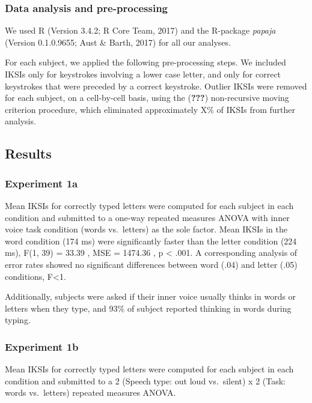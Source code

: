 \documentclass[floatsintext,man]{apa6}
\theoremstyle{definition}
\theoremstyle{definition}
\theoremstyle{definition}
\theoremstyle{remark}
\begin{document}
\subsubsection{Data analysis and
pre-processing}\label{data-analysis-and-pre-processing}

We used R (Version 3.4.2; R Core Team, 2017) and the R-package
\emph{papaja} (Version 0.1.0.9655; Aust \& Barth, 2017) for all our
analyses.

For each subject, we applied the following pre-processing steps. We
included IKSIs only for keystrokes involving a lower case letter, and
only for correct keystrokes that were preceded by a correct keystroke.
Outlier IKSIs were removed for each subject, on a cell-by-cell basis,
using the ({\textbf{???}}) non-recursive moving criterion procedure,
which eliminated approximately X\% of IKSIs from further analysis.

\subsection{Results}\label{results}

\subsubsection{Experiment 1a}\label{experiment-1a}

Mean IKSIs for correctly typed letters were computed for each subject in
each condition and submitted to a one-way repeated measures ANOVA with
inner voice task condition (words vs.~letters) as the sole factor. Mean
IKSIs in the word condition (174 ms) were significantly faster than the
letter condition (224 ms), F(1, 39) = 33.39 , MSE = 1474.36 , p
\textless{} .001. A corresponding analysis of error rates showed no
significant differences between word (.04) and letter (.05) conditions,
F\textless{}1.

Additionally, subjects were asked if their inner voice usually thinks in
words or letters when they type, and 93\% of subject reported thinking
in words during typing.

\subsubsection{Experiment 1b}\label{experiment-1b}

Mean IKSIs for correctly typed letters were computed for each subject in
each condition and submitted to a 2 (Speech type: out loud vs.~silent) x
2 (Task: words vs.~letters) repeated measures ANOVA.
\end{document}

